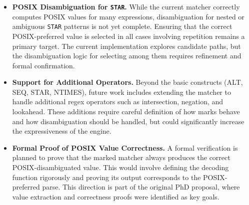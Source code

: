 \documentclass[12pt]{article}
\begin{document}
\begin{itemize}
\item \textbf{POSIX Disambiguation for \texttt{STAR}.}
While the current matcher correctly computes POSIX values for many expressions, disambiguation for nested or ambiguous \texttt{STAR} patterns is not yet complete. Ensuring that the correct POSIX-preferred value is selected in all cases involving repetition remains a primary target. The current implementation explores candidate paths, but the disambiguation logic for selecting among them requires refinement and formal confirmation.

\item \textbf{Support for Additional Operators.}
Beyond the basic constructs (ALT, SEQ, STAR, NTIMES), future work includes extending the matcher to handle additional regex operators such as intersection, negation, and lookahead. These additions require careful definition of how marks behave and how disambiguation should be handled, but could significantly increase the expressiveness of the engine.

\item \textbf{Formal Proof of POSIX Value Correctness.}
A formal verification is planned to prove that the marked matcher always produces the correct POSIX-disambiguated value. This would involve defining the decoding function rigorously and proving its output corresponds to the POSIX-preferred parse. This direction is part of the original PhD proposal, where value extraction and correctness proofs were identified as key goals.


\end{itemize}




\end{document}
